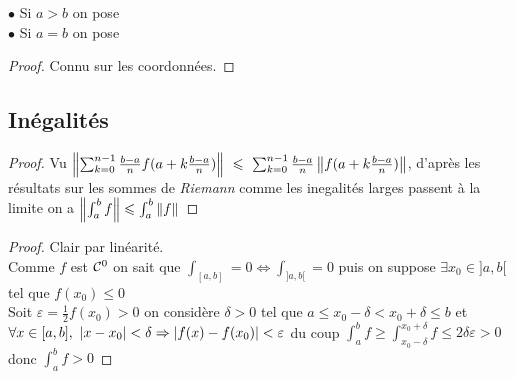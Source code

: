		$\bullet$ Si $a>b$ on pose  \\ 
		
		$\bullet$ Si $a=b$ on pose  \\
		
		
    	\begin{proof} 
    	Connu sur les coordonnées. 
    	\end{proof} \medskip 
    
    
	\subsection{Inégalités}
    
    	
    	\begin{proof}
    	Vu $\left\Vert \sum_{k=0}^{n-1} \frac{b-a}{n} f(a+k\frac{b-a}{n}) \right\Vert ~\leqslant ~\sum_{k=0}^{n-1} \frac{b-a}{n} \left\Vert f(a+k\frac{b-a}{n}) \right\Vert$, d'après les résultats sur les sommes de \emph{Riemann} comme les inegalités larges passent à la limite on a $\left\Vert \int_a^b f \right\Vert \leqslant \int_a^b \left\Vert f \right\Vert$
    	\end{proof} \medskip

		
		\begin{proof}
		\fbox{$\Rightarrow$} Clair par linéarité. \\ 
		\fbox{$\Leftarrow$} Comme $f$ est ${\mathcal{C}}^0$ on sait que $\int_{[a,b]} =0 \Leftrightarrow \int_{]a,b[} =0$ puis on suppose $\exists x_0 \in ]a,b[$ tel que $f(x_0) \leqslant 0$\\
		Soit $\varepsilon = \frac{1}{2} f(x_0) >0$ on considère $\delta >0$ tel que $a\leqslant x_0 -\delta < x_0+\delta \leqslant b$ et\\ 
		$\forall x\in [a,b],~\left\vert x-x_0 \right\vert < \delta \Rightarrow \left\vert f(x)-f(x_0) \right\vert <\varepsilon$ du coup $\int_a^b f \geqslant \int_{x_0-\delta}^{x_0+\delta} f \leqslant 2\delta\varepsilon >0$ donc $\int_a^b f >0$
		\end{proof} \medskip
		
